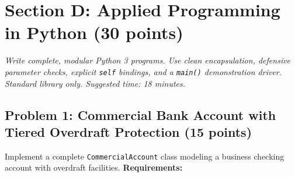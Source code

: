\documentclass[11pt,a4paper]{article}
\begin{document}
\section*{Section D: Applied Programming in Python \hfill \normalsize\normalfont(30 points)}
\textit{Write complete, modular Python 3 programs. Use clean encapsulation, defensive parameter checks, explicit \texttt{self} bindings, and a \texttt{main()} demonstration driver. Standard library only. Suggested time: 18 minutes.}
\subsection*{Problem 1: Commercial Bank Account with Tiered Overdraft Protection (15 points)}
Implement a complete \texttt{CommercialAccount} class modeling a business checking account with overdraft facilities.
\textbf{Requirements:}
\end{document}

